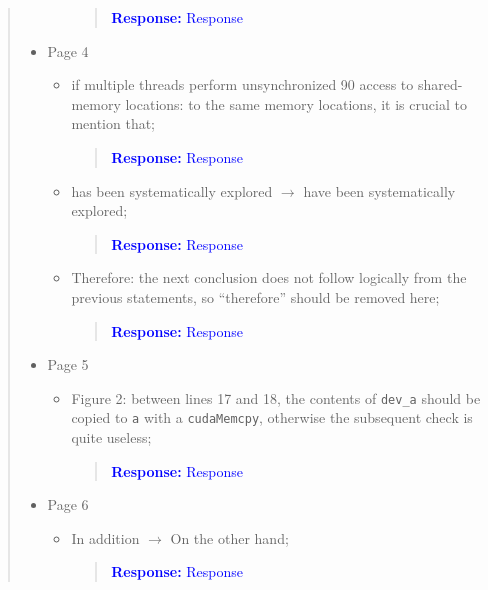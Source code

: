 \documentclass[11pt]{article}
\begin{document}
\begin{quote}
\begin{itemize}
\begin{itemize}
    \begin{quote}
    \textcolor{blue}{\textbf{Response:} Response}
    \end{quote}

  \end{itemize}
\item Page 4
  \begin{itemize}
  \item if multiple threads perform unsynchronized 90 access to shared-memory locations: to the same memory locations, it is crucial to mention that;
  
    \begin{quote}
    \textcolor{blue}{\textbf{Response:} Response}
    \end{quote}

  \item has been systematically explored $\rightarrow$ have been systematically explored;
  
    \begin{quote}
    \textcolor{blue}{\textbf{Response:} Response}
    \end{quote}

  \item Therefore: the next conclusion does not follow logically from the previous statements, so ``therefore'' should be removed here;
  
    \begin{quote}
    \textcolor{blue}{\textbf{Response:} Response}
    \end{quote}

  \end{itemize}
\item Page 5
  \begin{itemize}
  \item Figure 2: between lines 17 and 18, the contents of {\tt dev\_a} should be copied to {\tt a} with a {\tt cudaMemcpy}, otherwise the subsequent check is quite useless;
  
    \begin{quote}
    \textcolor{blue}{\textbf{Response:} Response}
    \end{quote}

  \end{itemize}
\item Page 6
  \begin{itemize}
  \item In addition $\rightarrow$ On the other hand;
  
    \begin{quote}
    \textcolor{blue}{\textbf{Response:} Response}
    \end{quote}


\end{itemize}
\end{itemize}
\end{quote}
\end{document}
